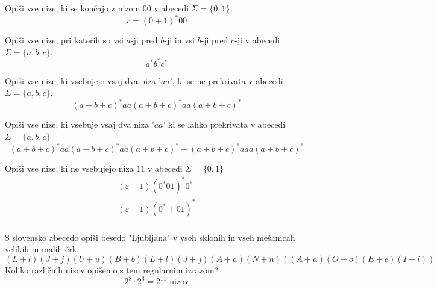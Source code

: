 \documentclass[10pt,a4paper,oneside]{book}
\begin{document}
\begin{primeri}
\item Opiši vse nize, ki se končajo z nizom $00$ v abecedi $\Sigma = \{ 0,1 \}$.
	\begin{displaymath}
	r = (0+1)^*00
	\end{displaymath}
	\item Opiši vse nize, pri katerih so vsi $a$-ji pred $b$-ji in vsi $b$-ji pred $c$-ji v abecedi $\Sigma = \lbrace a,b,c \rbrace$.
		\begin{displaymath}
		a^*b^*c^*
		\end{displaymath}
	\item Opiši vse nize, ki vsebujejo vsaj dva niza '$aa$', ki se ne prekrivata v abecedi $\Sigma = \lbrace a,b,c \rbrace$.
		\begin{displaymath}
		(a+b+c)^* aa (a+b+c)^* aa (a+b+c)^* 
		\end{displaymath}
	\item Opiši vse nize, ki vsebuje vsaj dva niza '$aa$' ki se lahko prekrivata v abecedi $\Sigma = \lbrace a,b,c \rbrace$
		\begin{displaymath}
		(a+b+c)^* aa (a+b+c)^* aa (a+b+c)^* + (a+b+c)^* aaa (a+b+c)^* 
		\end{displaymath}
	\item Opiši vse nize, ki ne vsebujejo niza $11$ v abecedi $\Sigma = \lbrace 0,1 \rbrace$\\
		\begin{align*} 
		(\varepsilon  + 1 )(0^*01)^* 0^* \\
		(\varepsilon  + 1 )(0^* + 01)^* \\
		\end{align*} 
	\item S slovensko abecedo opiši besedo "Ljubljana" v vseh sklonih in vseh mešanicah velikih in malih črk.
		\begin{displaymath}
		(L+l) (J+j) (U+u) (B+b) (L+l) (J+j) (A+a) (N+n) \left( (A+a)(O+o)(E+e)(I+i) \right) 
		\end{displaymath}
		Koliko različnih nizov opišemo s tem regularnim izrazom?\\
		\begin{displaymath}
		2^8 \cdot 2^3 = 2^{11} \mbox{ nizov}
		\end{displaymath}
\end{primeri}
\end{document}
